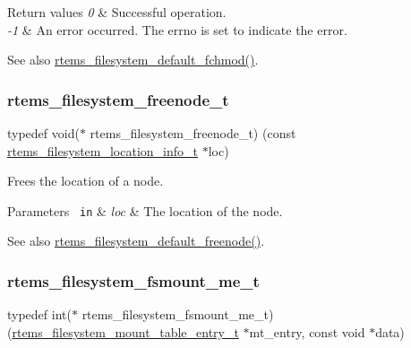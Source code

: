 \begin{DoxyRetVals}{Return values}
{\em 0} & Successful operation. \\
\hline
{\em -\/1} & An error occurred. The errno is set to indicate the error.\\
\hline
\end{DoxyRetVals}
\begin{DoxySeeAlso}{See also}
\mbox{\hyperlink{group__LibIOFSOps_ga3dd804eb9c4578e02e07eb0ee445af43}{rtems\+\_\+filesystem\+\_\+default\+\_\+fchmod()}}. 
\end{DoxySeeAlso}
\mbox{\label{group__LibIOFSOps_gae151461f446627c1bee2a12decf99745}} 
\subsubsection{\texorpdfstring{rtems\_filesystem\_freenode\_t}{rtems\_filesystem\_freenode\_t}}
{\footnotesize\ttfamily typedef void($\ast$ rtems\+\_\+filesystem\+\_\+freenode\+\_\+t) (const \mbox{\hyperlink{group__LibIO_ga3252b3d31ee3c49ffff0b7604a676864}{rtems\+\_\+filesystem\+\_\+location\+\_\+info\+\_\+t}} $\ast$loc)}



Frees the location of a node. 


\begin{DoxyParams}[1]{Parameters}
\mbox{\texttt{ in}}  & {\em loc} & The location of the node.\\
\hline
\end{DoxyParams}
\begin{DoxySeeAlso}{See also}
\mbox{\hyperlink{group__LibIOFSOps_ga801a36a04179ec2431409303fa1b9031}{rtems\+\_\+filesystem\+\_\+default\+\_\+freenode()}}. 
\end{DoxySeeAlso}
\mbox{\label{group__LibIOFSOps_gab86f790d75005100fc4d847f7cdc8aef}} 
\subsubsection{\texorpdfstring{rtems\_filesystem\_fsmount\_me\_t}{rtems\_filesystem\_fsmount\_me\_t}}
{\footnotesize\ttfamily typedef int($\ast$ rtems\+\_\+filesystem\+\_\+fsmount\+\_\+me\+\_\+t) (\mbox{\hyperlink{structrtems__filesystem__mount__table__entry__tt}{rtems\+\_\+filesystem\+\_\+mount\+\_\+table\+\_\+entry\+\_\+t}} $\ast$mt\+\_\+entry, const void $\ast$data)}



